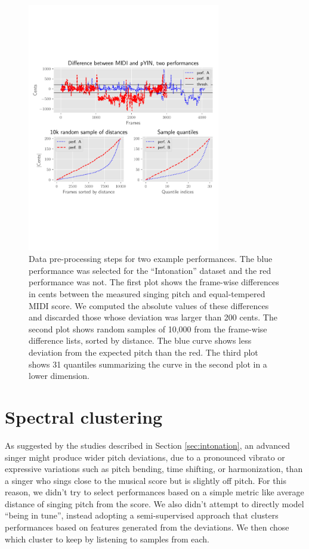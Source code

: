 \begin{figure}[h!]
    \centering
    \includegraphics[width=0.75\textwidth]{figures/data_processing_pipeline.pdf}\vspace{-1in}
    \caption{Data pre-processing steps for two example performances. The blue performance was selected for the ``Intonation'' dataset and the red performance was not. The first plot shows the frame-wise differences in cents between the measured singing pitch and equal-tempered MIDI score. We computed the absolute values of these differences and discarded those whose deviation was larger than 200 cents. The second plot shows random samples of 10,000 from the frame-wise difference lists, sorted by distance. The blue curve shows less deviation from the expected pitch than the red. The third plot shows 31 quantiles summarizing the curve in the second plot in a lower dimension.}
    \label{fig:pipeline}
\end{figure}
\section{Spectral clustering}
As suggested by the studies described in Section \ref{sec:intonation}, an advanced singer might produce wider pitch deviations, due to a pronounced vibrato or expressive variations such as pitch bending, time shifting, or harmonization, than a singer who sings close to the musical score but is slightly off pitch. For this reason, we didn't try to select performances based on a simple metric like average distance of singing pitch from the score. We also didn't attempt to directly model ``being in tune'', instead adopting a semi-supervised approach that clusters performances based on features generated from the deviations. We then chose which cluster to keep by listening to samples from each.

